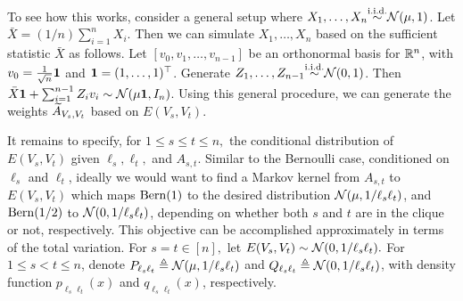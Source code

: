 To see how this works, consider a general setup where 
$X_1,\ldots,X_n {\stackrel{\text{i.i.d.}}{\sim}} {\mathcal{N}}(\mu,1)$. Let $\bar X = (1/n) \sum_{i=1}^n X_i$. 
Then we can simulate $X_1,\ldots,X_n$ based on the sufficient statistic $\bar X$ as follows. 
Let $[v_0,v_1,\ldots,v_{n-1}]$ be an orthonormal basis for ${\mathbb{R}}^n$, with $v_0= \frac{1}{\sqrt{n}} \mathbf 1$ and $\mathbf 1 = (1,\ldots,1)^\top$.
Generate $Z_1,\ldots,Z_{n-1}{\stackrel{\text{i.i.d.}}{\sim}} {\mathcal{N}}(0,1)$. Then $\bar X \mathbf 1 + \sum_{i=1}^{n-1} Z_i v_i \sim {\mathcal{N}}(\mu \mathbf 1,I_n)$.
Using this general procedure, we can generate the weights 
${\widetilde{A}}_{V_s,V_t}$ 
based on $E(V_s, V_t)$.  


It remains to specify, for $1\leq s \leq t \leq n,$
the conditional distribution of $E(V_s,V_t)$ given $\ell_s, \ell_t,$ and $A_{s,t}.$
Similar to the Bernoulli case, conditioned on $\ell_s$ and $\ell_t$, ideally we would want to find
a Markov kernel from $A_{s,t}$ to $E(V_s,V_t)$ which maps  
${\rm Bern}(1)$  to the desired distribution ${\mathcal{N}}(\mu, 1/\ell_s \ell_t)$, 
and ${\rm Bern}(1/2)$  to ${\mathcal{N}}(0,1/\ell_s\ell_t)$, 
depending on whether both $s$ and $t$ are in the clique or not, respectively. 
This objective can be accomplished approximately in terms of the total variation. 
For $s=t \in [n],$  let $E(V_s,V_t)\sim {\mathcal{N}}( 0, 1/\ell_s\ell_t).$
For $ 1 \le s < t \le n$, denote 
$P_{\ell_s \ell_t} \triangleq {\mathcal{N}}( \mu, 1/\ell_s \ell_t)$ and 
$Q_{\ell_s \ell_t} \triangleq {\mathcal{N}}(0, 1/\ell_s \ell_t)$, 
with density function $p_{\ell_s\ell_t}(x)$ and $q_{\ell_s\ell_t}(x)$, respectively. 


